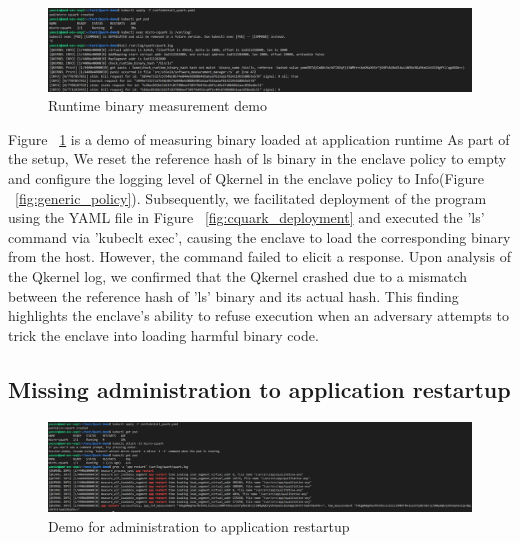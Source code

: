  \begin{figure}[H]
    \centering
    \includegraphics[width=1\textwidth]{images/cquark_runtime_runtime_binary_measurement_demo.png}
    \caption[Runtime binary measurement demo]{Runtime binary measurement demo}
    \label{fig:cquark_runtime_runtime_binary_measurement_demo}
\end{figure}


Figure ~\ref{fig:cquark_runtime_runtime_binary_measurement_demo} is a demo of measuring binary loaded at application runtime  As part of the setup, We reset the reference hash of ls binary in the enclave policy to empty and configure the logging level of Qkernel in the enclave policy to 
Info(Figure ~\ref{fig:generic_policy}). Subsequently, we facilitated deployment of the program using the YAML file in Figure ~\ref{fig:cquark_deployment} and executed the 'ls' command via 'kubeclt exec', causing the enclave to load the 
corresponding binary from the host. However, the command failed to elicit a response. Upon analysis of the Qkernel log, we confirmed that the Qkernel crashed due to a mismatch between the reference hash of 'ls' binary and its actual hash. 
This finding highlights the enclave's ability to refuse execution when an adversary attempts to trick the enclave into loading harmful binary code.

\subsection{Missing administration to application restartup}

\begin{figure}[H]
    \centering
    \includegraphics[width=1\textwidth]{images/cquark_restart_administration_demo.png}
    \caption[Demo for  administration to application restartup]{Demo for  administration to application restartup}
    \label{fig:cquark_restart_administration_demo}
\end{figure}



